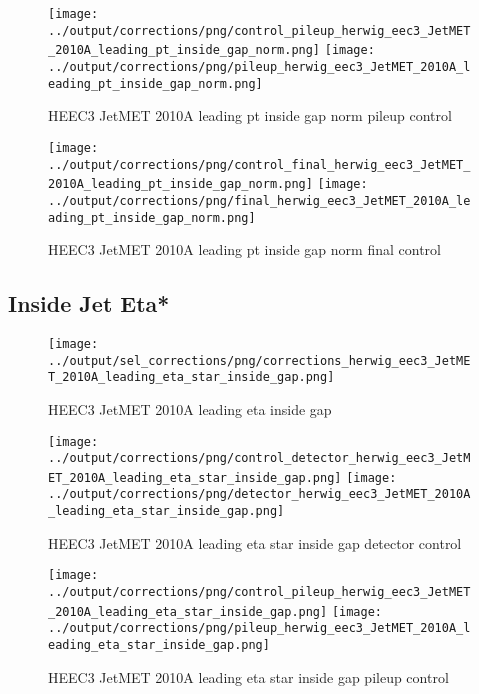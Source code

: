 \documentclass[11pt]{book}
\begin{document}
\begin{figure}[ht]
\centering
\texttt{[image: ../output/corrections/png/control\_pileup\_herwig\_eec3\_JetMET\_2010A\_leading\_pt\_inside\_gap\_norm.png]}
\texttt{[image: ../output/corrections/png/pileup\_herwig\_eec3\_JetMET\_2010A\_leading\_pt\_inside\_gap\_norm.png]}
\caption{HEEC3 JetMET 2010A leading pt inside gap norm pileup control}
\label{fig:HEEC3_JetMET_2010A_leading_pt_inside_gap_norm_pileup_control}
\end{figure}


\begin{figure}[ht]
\centering
\texttt{[image: ../output/corrections/png/control\_final\_herwig\_eec3\_JetMET\_2010A\_leading\_pt\_inside\_gap\_norm.png]}
\texttt{[image: ../output/corrections/png/final\_herwig\_eec3\_JetMET\_2010A\_leading\_pt\_inside\_gap\_norm.png]}
\caption{HEEC3 JetMET 2010A leading pt inside gap norm final control}
\label{fig:HEEC3_JetMET_2010A_leading_pt_inside_gap_norm_final_control}
\end{figure}


\clearpage
\subsection{Inside Jet Eta*}
\begin{figure}[ht]
\centering
\texttt{[image: ../output/sel\_corrections/png/corrections\_herwig\_eec3\_JetMET\_2010A\_leading\_eta\_star\_inside\_gap.png]}
\caption{HEEC3 JetMET 2010A leading eta inside gap}
\label{fig:HEEC3_JetMET_2010A_leading_eta_star_inside_gap}
\end{figure}

\begin{figure}[ht]
\centering
\texttt{[image: ../output/corrections/png/control\_detector\_herwig\_eec3\_JetMET\_2010A\_leading\_eta\_star\_inside\_gap.png]}
\texttt{[image: ../output/corrections/png/detector\_herwig\_eec3\_JetMET\_2010A\_leading\_eta\_star\_inside\_gap.png]}
\caption{HEEC3 JetMET 2010A leading eta star inside gap detector control}
\label{fig:HEEC3_JetMET_2010A_leading_eta_star_inside_gap_detector_control}
\end{figure}

\begin{figure}[ht]
\centering
\texttt{[image: ../output/corrections/png/control\_pileup\_herwig\_eec3\_JetMET\_2010A\_leading\_eta\_star\_inside\_gap.png]}
\texttt{[image: ../output/corrections/png/pileup\_herwig\_eec3\_JetMET\_2010A\_leading\_eta\_star\_inside\_gap.png]}
\caption{HEEC3 JetMET 2010A leading eta star inside gap pileup control}
\label{fig:HEEC3_JetMET_2010A_leading_eta_star_inside_gap_pileup_control}
\end{figure}
\end{document}
